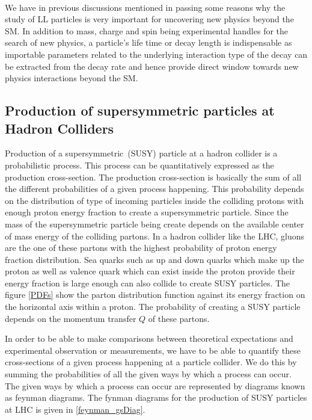 {\paragraph*{}
We have in previous discussions mentioned in passing some reasons why the study of LL particles is very important for uncovering new physics beyond the SM. In addition to mass, charge and spin being experimental handles for the search of new physics, a particle's life time or decay length is indispensable as importable parameters related to the underlying interaction type of the decay can be extracted from the decay rate and hence provide direct window towards new physics interactions beyond the SM.
\subsection{Production of supersymmetric particles at Hadron Colliders}
Production of a supersymmetric~(SUSY) particle at a hadron collider is a probabilistic process. This process can be quantitatively expressed as the production cross-section. The production cross-section is basically the sum of all the different probabilities of a given process happening. This probability depends on the distribution of type of incoming particles inside the colliding protons with enough proton energy fraction to create a supersymmetric particle. Since the mass of the supersymmetric particle being create depends on the available center of mass energy of the colliding partons. In a hadron collider like the LHC, gluons are the one of these partons with the highest probability of proton energy fraction distribution. Sea quarks such as up and down quarks which make up the proton as well as valence quark which can exist inside the proton provide their energy fraction is large enough can also collide to create SUSY particles. The figure \eqref{PDFs} show the parton distribution function against its energy fraction on the horizontal axis within a proton. The probability of creating a SUSY particle depends on the momentum transfer $Q$ of these partons.

\begin{center}
\label{fig:PDFs}
\end{center}
In order to be able to make comparisons between theoretical expectations and experimental observation or measurements, we have to be able to quantify these cross-sections of a given process happening  at a particle collider. We do this by summing the probabilities of all the given ways by which a process can occur. The given ways by which a process can occur are represented by diagrams known as feynman diagrams. The fynman diagrams for the production of SUSY particles at LHC is given in \eqref{feynman_gsDiag}. 

}
